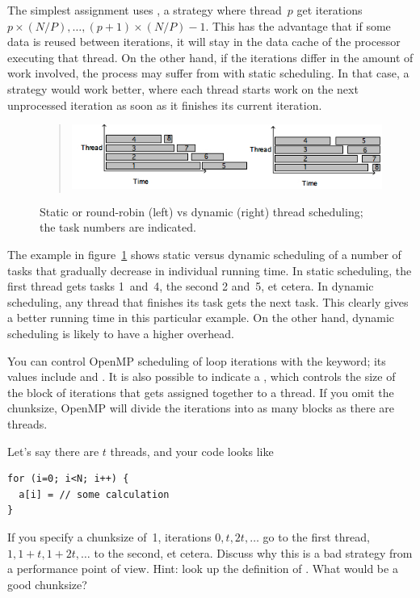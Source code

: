 The simplest assignment uses , a
 strategy where thread~$p$ get iterations
$p\times(N/P),\ldots,(p+1)\times (N/P)-1$.
This has the advantage that if some data is
reused between iterations, it will stay in the data cache of the
processor executing that thread. On the other hand, if the iterations
differ in the amount of work involved, the process may suffer from
 with static scheduling. In that case, a
 strategy would work better, where each
thread starts work on the next unprocessed iteration as soon as it
finishes its current iteration.
\begin{figure}
  \begin{quote}
  \includegraphics[scale=.7]{graphics/scheduling}
  \end{quote}
  \caption{Static or round-robin (left) vs dynamic (right) thread
    scheduling; the task numbers are indicated.}
  \label{fig:staticdynamic}
\end{figure}
The example in figure~\ref{fig:staticdynamic} shows static versus
dynamic scheduling of a number of tasks that gradually decrease in
individual running time. In static scheduling, the first thread gets
tasks 1~and~4, the second 2 and~5, et cetera. In dynamic scheduling,
any thread that finishes its task gets the next task. This clearly
gives a better running time in this particular example. On the other
hand, dynamic scheduling is likely to have a higher overhead.

You can control OpenMP scheduling of loop iterations with the 
keyword; its values include  and . It is also possible 
to indicate a , which controls the size of the block of 
iterations that gets assigned together to a thread. If you omit the chunksize,
OpenMP will divide the iterations into as many blocks as there are threads.

\begin{exercise}
Let's say there are $t$ threads, and your code looks like
\begin{verbatim}
for (i=0; i<N; i++) {
  a[i] = // some calculation
}
\end{verbatim}
If you specify a chunksize of~1,
iterations $0,t,2t,\ldots$ go to the first thread,
$1,1+t,1+2t,\ldots$ to the second, et cetera. Discuss why this is a bad
strategy from a performance point of view. Hint: look up the definition of
. What would be a good chunksize?
\end{exercise}

